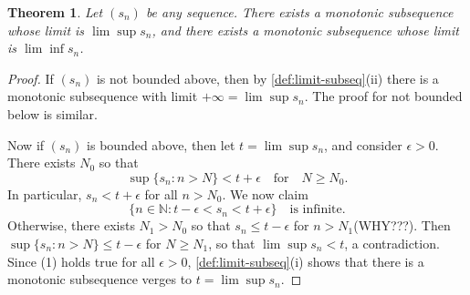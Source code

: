 \documentclass[12pt, lettersize]{book}
\newtheorem{thm}{Theorem}[section]
\begin{document}
		\setcounter{equation}{0}
		\begin{thm}\label{def:subsequence with limit limsup or liminf}
		Let $(s_n)$ be any sequence. There exists a monotonic subsequence whose limit is $\lim\sup s_n$, and there exists a monotonic subsequence whose limit is $\lim\inf s_n$.
		\end{thm}
		\begin{proof}
			If $(s_n)$ is not bounded above, then by \ref{def:limit-subseq}(ii) there is a monotonic subsequence with limit $+\infty=\lim\sup s_n$. The proof for not bounded below is similar.
			
			Now if $(s_n)$ is bounded above, then let $t=\lim\sup s_n$, and consider $\epsilon>0$. There exists $N_0$ so that
			\begin{displaymath}
				\sup\{s_n: n>N\}<t+\epsilon\quad\text{for}\quad N\geq N_0.
			\end{displaymath}
			In particular, $s_n<t+\epsilon$ for all $n>N_0$. We now claim
			\begin{equation}
				\{n\in\mathbb{N}: t-\epsilon<s_n<t+\epsilon\}\quad\text{is infinite.}
			\end{equation}
			Otherwise, there exists $N_1>N_0$ so that $s_n\leq t-\epsilon$ for $n>N_1$(WHY???). Then $\sup\{s_n: n>N\}\leq t-\epsilon$ for $N\geq N_1$, so that $\lim\sup s_n<t$, a contradiction. Since (1) holds true for all $\epsilon>0$, \ref{def:limit-subseq}(i) shows that there is a monotonic subsequence verges to $t=\lim\sup s_n$.
		\end{proof}
		
\end{document}
